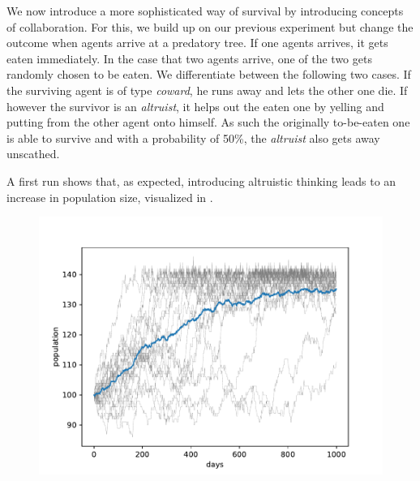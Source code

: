 \documentclass[sigconf]{acmart}
\newcommand{\todo}[1]{{\color{red}{#1}}}
\newcommand{\coward}{\textit{coward}\xspace}
\newcommand{\altruist}{\textit{altruist}\xspace}
\begin{document}
    We now introduce a more sophisticated way of survival by introducing concepts of collaboration.
    For this, we build up on our previous experiment but change the outcome when agents arrive at a predatory tree.
    If one agents arrives, it gets eaten immediately.
    In the case that two agents arrive, one of the two gets randomly chosen to be eaten.
    We differentiate between the following two cases.
    If the surviving agent is of type \coward, he runs away and lets the other one die.
    If however the survivor is an \altruist, it helps out the eaten one by yelling and putting from the other agent onto himself.
    As such the originally to-be-eaten one is able to survive and with a probability of 50\%, the \altruist also gets away unscathed.

    \todo{add code with logic}

    A first run shows that, as expected, introducing altruistic thinking leads to an increase in population size, visualized in .

    \begin{figure}
        \includegraphics[width=\columnwidth]{figures/alt_cow_increase_total}
        \caption{\todo{leave this figure in as it shows that the total population varies a lot which cannot be seen as easily in plot 3}
        \todo{maybe set the same y-axis }
        }
        \label{fig:alt_cow_total}
    \end{figure}
\end{document}
